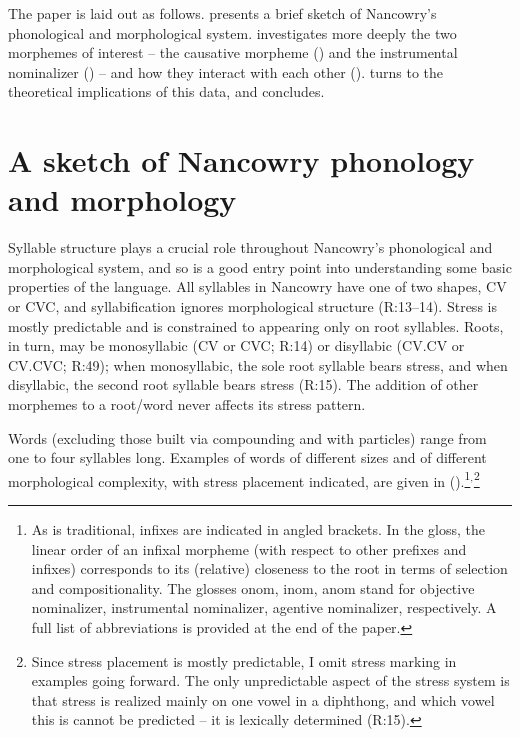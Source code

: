 \documentclass[output=paper]{langscibook}
\newcounter{nexttmp}    %
\newcommand{\Next}{\setcounter{nexttmp}{\value{equation}}\stepcounter{nexttmp}(\thenexttmp)\xspace}
\begin{document}
The paper is laid out as follows.  presents a brief sketch of Nancowry's phonological and morphological system.  investigates more deeply the two morphemes of interest -- the causative morpheme () and the instrumental nominalizer () -- and how they interact with each other ().  turns to the theoretical implications of this data, and  concludes.

\section{A sketch of Nancowry phonology and morphology}\label{sec:kalin:2}

Syllable structure plays a crucial role throughout Nancowry's phonological and morphological system, and so is a good entry point into understanding some basic properties of the language. All syllables in Nancowry have one of two shapes, CV or CVC, and syllabification ignores morphological structure (R:13--14). Stress is mostly predictable and is constrained to appearing only on root syllables. Roots, in turn, may be monosyllabic (CV or CVC; R:14) or disyllabic (CV.CV or CV.CVC; R:49); when monosyllabic, the sole root syllable bears stress, and when disyllabic, the second root syllable bears stress (R:15). The addition of other morphemes to a root/word never affects its stress pattern. 

Words (excluding those built via compounding and with particles) range from one to four syllables long. Examples of words of different sizes and of different morphological complexity, with stress placement indicated, are given in \Next.\footnote{As is traditional, infixes are indicated in angled brackets. In the gloss, the linear order of an infixal morpheme (with respect to other prefixes and infixes) corresponds to its (relative) closeness to the root in terms of selection and compositionality. The glosses {\sc onom, inom, anom} stand for objective nominalizer, instrumental nominalizer, agentive nominalizer, respectively. A full list of abbreviations is provided at the end of the paper.}$^{,}$\footnote{Since stress placement is mostly predictable, I omit stress marking in examples going forward. The only unpredictable aspect of the stress system is that stress is realized mainly on one vowel in a diphthong, and which vowel this is cannot be predicted -- it is lexically determined (R:15).}
\end{document}
